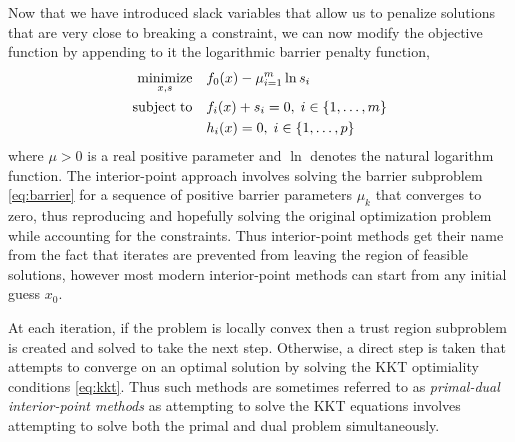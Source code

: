 Now that we have introduced slack variables that allow us to penalize solutions that are very close to breaking a constraint, we can now modify the objective function by appending to it the logarithmic barrier penalty function,
\begin{align} \label{eq:barrier}
\operatornamewithlimits{minimize}_{x,s}\quad &
  f_0(x) - \mu \sum_{i=1}^m \ln s_i \nonumber \\
\mathrm{subject\;to} \quad &
  f_i(x) + s_i = 0, \; i \in \left\{1, \dots, m \right\} \\
& h_i(x) = 0, \; i \in \left\{1, \dots, p \right\} \nonumber
\end{align}
where $\mu > 0$ is a real positive parameter and $\ln$ denotes the natural logarithm function. The interior-point approach involves solving the barrier subproblem \eqref{eq:barrier} for a sequence of positive barrier parameters $\mu_k$ that converges to zero, thus reproducing and hopefully solving the original optimization problem while accounting for the constraints. Thus interior-point methods get their name from the fact that iterates are prevented from leaving the region of feasible solutions, however most modern interior-point methods can start from any initial guess $x_0$.

At each iteration, if the problem is locally convex then a trust region subproblem is created and solved to take the next step. Otherwise, a direct step is taken that attempts to converge on an optimal solution by solving the KKT optimiality conditions \eqref{eq:kkt}. Thus such methods are sometimes referred to as \emph{primal-dual interior-point methods} as attempting to solve the KKT equations involves attempting to solve both the primal and dual problem simultaneously.

